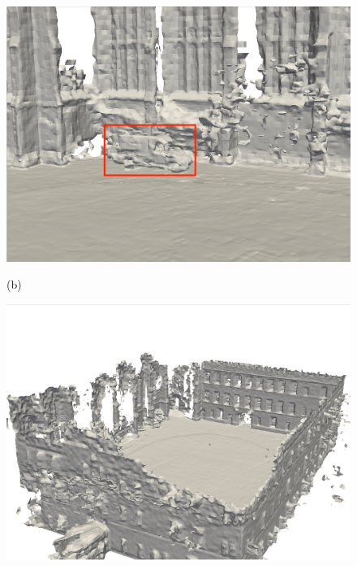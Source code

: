 \begin{figure}[htbp]
\begin{minipage}{0.322\linewidth}
\end{minipage}\hfill
\begin{minipage}{0.322\linewidth}
    \centering
    \includegraphics[width=1\linewidth]{figures/ncd_1_vox.png}
\end{minipage}\vfill
(b)
\begin{minipage}{0.322\linewidth}
    \centering
    \includegraphics[width=1\linewidth]{figures/ncd_3_bce.png}
\end{minipage}\hfill
\begin{minipage}{0.322\linewidth}
    \centering

\end{minipage}
\end{figure}
